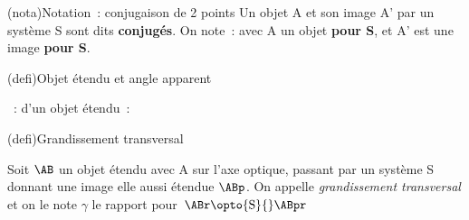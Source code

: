 \documentclass[../../main/main.tex]{subfiles}
\begin{document}
\begin{tcb}[label=nota_opt](nota){Notation~: conjugaison de 2 points}
	Un objet A et son image A' par un système S sont dits \textbf{conjugés}.
	On note~:
	avec A un objet \textbf{pour S}, et A' est une image \textbf{pour S}.
\end{tcb}

\begin{tcb}[label=def:objet](defi){Objet étendu et angle apparent}
	\begin{itemize}[label=$\diamond$, leftmargin=10pt]
		~: 
		 d'un objet étendu~: 
	\end{itemize}
\end{tcb}
\begin{tcb}[label=def:grand, sidebyside](defi){Grandissement transversal}

	Soit $\AB$ un objet étendu avec A sur l'axe optique, passant par
	un système S donnant une image elle aussi étendue $\ABp$. On
	appelle \textit{grandissement transversal} et on le note $\gamma$ le
	rapport
	\psw{
		\[
			\boxed{\gamma = \frac{\ABp}{\AB}}
		\]
	}
	pour $\ABr \opto{\rm  S}{} \ABpr$
	\tcblower
	\begin{center}
	\end{center}
\end{tcb}
\end{document}
